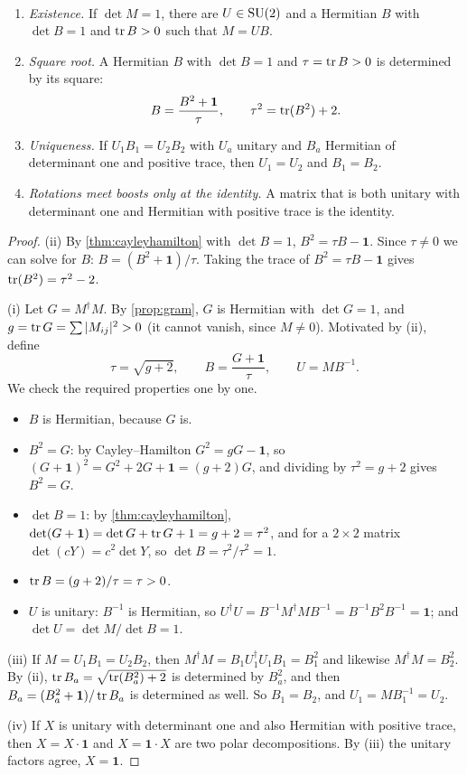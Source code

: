 \begin{theorem}\label{thm:polar}\ver\
\begin{enumerate}[label=(\roman*)]
\item \emph{Existence.} If $\det M=1$, there are $U\in\mathrm{SU}(2)$ and a Hermitian $B$ with $\det B=1$ and $\operatorname{tr} B>0$ such that $M=UB$.
\item \emph{Square root.} A Hermitian $B$ with $\det B=1$ and $\tau=\operatorname{tr} B>0$ is determined by its square:
\[
B=\frac{B^2+\mathbf 1}{\tau},\qquad \tau^2=\operatorname{tr}(B^2)+2 .
\]
\item \emph{Uniqueness.} If $U_1B_1=U_2B_2$ with $U_a$ unitary and $B_a$ Hermitian of determinant one and positive trace, then $U_1=U_2$ and $B_1=B_2$.
\item \emph{Rotations meet boosts only at the identity.} A matrix that is both unitary with determinant one and Hermitian with positive trace is the identity.
\end{enumerate}
\end{theorem}

\begin{proof}
(ii) By \cref{thm:cayleyhamilton} with $\det B=1$, $B^2=\tau B-\mathbf 1$. Since $\tau\ne0$ we can solve for $B$: $B=(B^2+\mathbf 1)/\tau$. Taking the trace of $B^2=\tau B-\mathbf 1$ gives $\operatorname{tr}(B^2)=\tau^2-2$.

(i) Let $G=M^\dagger M$. By \cref{prop:gram}, $G$ is Hermitian with $\det G=1$, and $g=\operatorname{tr} G=\sum|M_{ij}|^2>0$ (it cannot vanish, since $M\ne0$). Motivated by (ii), define
\[
\tau=\sqrt{g+2},\qquad B=\frac{G+\mathbf 1}{\tau},\qquad U=MB^{-1}.
\]
We check the required properties one by one.
\begin{itemize}[nosep]
\item $B$ is Hermitian, because $G$ is.
\item $B^2=G$: by Cayley--Hamilton $G^2=gG-\mathbf 1$, so $(G+\mathbf 1)^2=G^2+2G+\mathbf 1=(g+2)G$, and dividing by $\tau^2=g+2$ gives $B^2=G$.
\item $\det B=1$: by \cref{thm:cayleyhamilton}, $\det(G+\mathbf 1)=\det G+\operatorname{tr} G+1=g+2=\tau^2$, and for a $2\times2$ matrix $\det(cY)=c^2\det Y$, so $\det B=\tau^2/\tau^2=1$.
\item $\operatorname{tr} B=(g+2)/\tau=\tau>0$.
\item $U$ is unitary: $B^{-1}$ is Hermitian, so $U^\dagger U=B^{-1}M^\dagger MB^{-1}=B^{-1}B^2B^{-1}=\mathbf 1$; and $\det U=\det M/\det B=1$.
\end{itemize}

(iii) If $M=U_1B_1=U_2B_2$, then $M^\dagger M=B_1U_1^\dagger U_1B_1=B_1^2$ and likewise $M^\dagger M=B_2^2$. By (ii), $\operatorname{tr} B_a=\sqrt{\operatorname{tr}(B_a^2)+2}$ is determined by $B_a^2$, and then $B_a=(B_a^2+\mathbf 1)/\operatorname{tr} B_a$ is determined as well. So $B_1=B_2$, and $U_1=MB_1^{-1}=U_2$.

(iv) If $X$ is unitary with determinant one and also Hermitian with positive trace, then $X=X\cdot\mathbf 1$ and $X=\mathbf 1\cdot X$ are two polar decompositions. By (iii) the unitary factors agree, $X=\mathbf 1$.
\end{proof}

